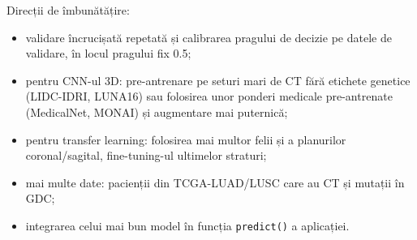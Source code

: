 \documentclass[runningheads,a4paper,11pt]{report}
\begin{document}
Direcții de îmbunătățire:
\begin{itemize}
    \item validare încrucișată repetată și calibrarea pragului de decizie pe datele de validare, în locul pragului fix 0.5;
    \item pentru CNN-ul 3D: pre-antrenare pe seturi mari de CT fără etichete genetice (LIDC-IDRI, LUNA16) sau folosirea unor ponderi medicale pre-antrenate (MedicalNet, MONAI) și augmentare mai puternică;
    \item pentru transfer learning: folosirea mai multor felii și a planurilor coronal/sagital, fine-tuning-ul ultimelor straturi;
    \item mai multe date: pacienții din TCGA-LUAD/LUSC care au CT și mutații în GDC;
    \item integrarea celui mai bun model în funcția \texttt{predict()} a aplicației.
\end{itemize}
\end{document}
